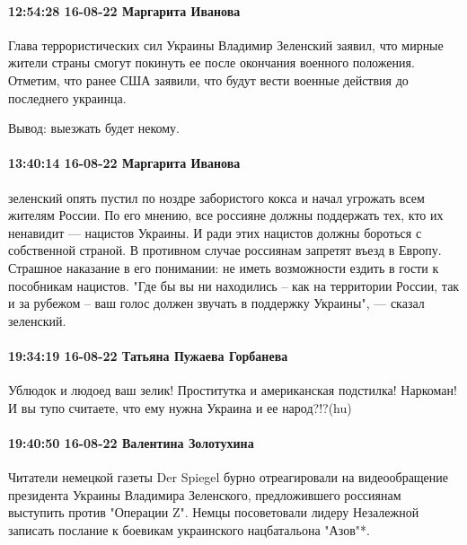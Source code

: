  
 
 
 
 

\paragraph{12:54:28 16-08-22 Маргарита Иванова}

Глава террористических сил Украины Владимир Зеленский заявил, что мирные
жители страны смогут покинуть ее после окончания военного положения. Отметим,
что ранее США заявили, что будут вести военные действия до последнего
украинца.

Вывод: выезжать будет некому.

\paragraph{13:40:14 16-08-22 Маргарита Иванова}

\obeycr
зеленский опять пустил по ноздре забористого кокса и начал угрожать всем жителям России.
По его мнению, все россияне должны поддержать тех, кто их ненавидит — нацистов Украины. И ради этих нацистов должны бороться с собственной страной. В противном случае россиянам запретят въезд в Европу.🤣🤣🤣
Страшное наказание в его понимании: не иметь возможности ездить в гости к пособникам нацистов.
"Где бы вы ни находились – как на территории России, так и за рубежом – ваш голос должен звучать в поддержку Украины", — сказал зеленский.
\restorecr

\paragraph{19:34:19 16-08-22 Татьяна Пужаева Горбанева}

Ублюдок и людоед ваш зелик! Проститутка и американская подстилка! Наркоман!
И вы тупо считаете, что ему нужна Украина и ее народ?!?(hu)

\paragraph{19:40:50 16-08-22 Валентина Золотухина}

Читатели немецкой газеты Der Spiegel бурно отреагировали на видеообращение
президента Украины Владимира Зеленского, предложившего россиянам выступить
против "Операции Z". Немцы посоветовали лидеру Незалежной записать послание к
боевикам украинского нацбатальона "Азов"*.

